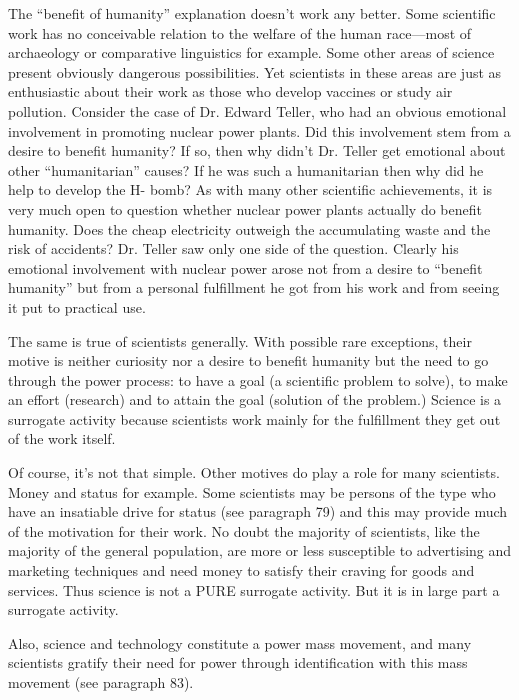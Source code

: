  The “benefit of humanity” explanation doesn’t work any better. Some scientific work has no conceivable relation to the welfare of the human race—most of archaeology or comparative linguistics for example. Some other areas of science present obviously dangerous possibilities. Yet scientists in these areas are just as enthusiastic about their work as those who develop vaccines or study air pollution. Consider the case of Dr. Edward Teller, who had an obvious emotional involvement in promoting nuclear power plants. Did this involvement stem from a desire to benefit humanity? If so, then why didn’t Dr. Teller get emotional about other “humanitarian” causes? If he was such a humanitarian then why did he help to develop the H- bomb? As with many other scientific achievements, it is very much open to question whether nuclear power plants actually do benefit humanity. Does the cheap electricity outweigh the accumulating waste and the risk of accidents? Dr. Teller saw only one side of the question. Clearly his emotional involvement with nuclear power arose not from a desire to “benefit humanity” but from a personal fulfillment he got from his work and from seeing it put to practical use.

 The same is true of scientists generally. With possible rare exceptions, their motive is neither curiosity nor a desire to benefit humanity but the need to go through the power process: to have a goal (a scientific problem to solve), to make an effort (research) and to attain the goal (solution of the problem.) Science is a surrogate activity because scientists work mainly for the fulfillment they get out of the work itself.

 Of course, it’s not that simple. Other motives do play a role for many scientists. Money and status for example. Some scientists may be persons of the type who have an insatiable drive for status (see paragraph 79) and this may provide much of the motivation for their work. No doubt the majority of scientists, like the majority of the general population, are more or less susceptible to advertising and marketing techniques and need money to satisfy their craving for goods and services. Thus science is not a PURE surrogate activity. But it is in large part a surrogate activity.

 Also, science and technology constitute a power mass movement, and many scientists gratify their need for power through identification with this mass movement (see paragraph 83).

